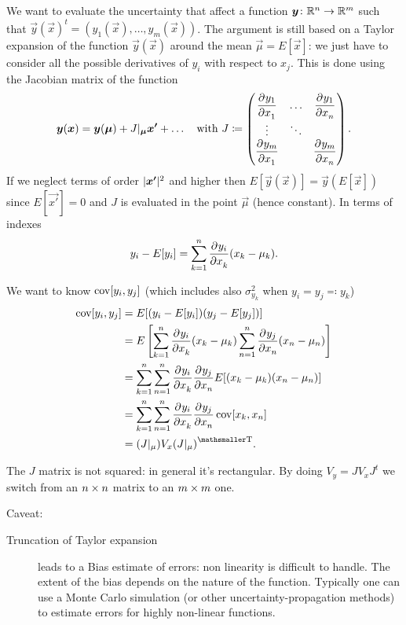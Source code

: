 We want to evaluate the uncertainty that affect a function $\bm{{y}}\colon \mathbb{R}^n\to\mathbb{R}^m$ such that $\vec{y}(\vec{x})^t = (y_1(\vec{x}),\dots,y_m(\vec{x}))$.
The argument is still based on a Taylor expansion of the function $\vec{y}(\vec{x})$ around the mean $\vec{\mu} = E[\vec{x}]$: we just have to consider all the possible derivatives of $y_i$ with respect to $x_j$.
This is done using the Jacobian matrix of the function
\begin{equation}
	\vec{y}(\vec{x}) = \vec{y}(\vec{\mu}) + J|_{\vec{\mu}}\vec{x'} + \dots{}
	\quad
	\text{with }
	J\coloneqq
	\begin{pmatrix}
		\pderiv{y_1}{x_1} &\dots &\pderiv{y_1}{x_n}\\
		\vdots &\ddots &\\
		\pderiv{y_m}{x_1} & &\pderiv{y_m}{x_n}\\
	\end{pmatrix}.
\end{equation}
If we neglect terms of order $\lvert\bm{{x'}}\rvert^2$ and higher then $E[\vec{y}(\vec{x})] = \vec{y}(E[\vec{x}])$ since $E[\vec{x'}] = 0$ and $J$ is evaluated in the point $\vec{\mu}$ (hence constant).
In terms of indexes
\begin{equation}
	y_i - E[y_i] = \sum_{k=1}^n\dfrac{{\mathop{}\!\mathrm{\partial}^{}}y_i}{\mathop{}\!\mathrm{\partial} x_k^{}}(x_k - \mu_k).
\end{equation}


We want to know $\operatorname{cov}[y_i,y_j]$ (which includes also $\sigma_{y_k}^2$ when $y_i = y_j \eqqcolon y_k$)
\begin{equation}
	\begin{aligned}
		\cov[y_i,y_j]
		&= E[(y_i - E[y_i])(y_j - E[y_j])] \\
  &= E\left[ \sum_{k=1}^n\pderiv{y_i}{x_k}(x_k - \mu_k) \sum_{n=1}^n\pderiv{y_j}{x_n}(x_n - \mu_n)\right] \\
  &= \sum_{k=1}^n\sum_{n=1}^n\pderiv{y_i}{x_k}\pderiv{y_j}{x_n} E[(x_k - \mu_k)(x_n - \mu_n)]\\
  &= \sum_{k=1}^n\sum_{n=1}^n\pderiv{y_i}{x_k}\pderiv{y_j}{x_n} \cov[x_k,x_n]\\
  &= (J\rvert_\mu) V_x \transpose{(J\rvert_\mu)}.
	\end{aligned}
\end{equation}

The $J$ matrix is not squared: in general it's rectangular.
By doing $V_y = JV_xJ^t$ we switch from an $n\times n$ matrix to an $m\times m$ one.

Caveat:
\begin{description}
	\item[Truncation of Taylor expansion] leads to a Bias estimate of errors: non linearity is difficult to handle.
		The extent of the bias depends on the nature of the function.
		Typically one can use a Monte Carlo simulation (or other uncertainty-propagation methods) to estimate errors for highly non-linear functions.
\end{description}

